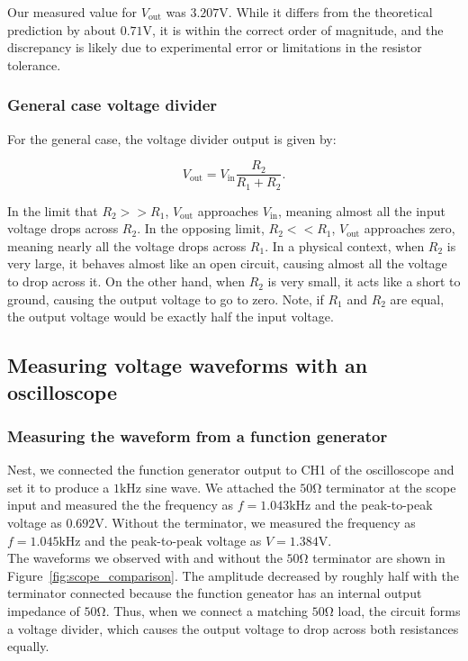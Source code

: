 \documentclass{article}
\begin{document}
\noindent Our measured value for $V_\text{out}$ was $3.207\si{\volt}$. While it differs
from the theoretical prediction by about $0.71\si{\volt}$, it is within the correct
order of magnitude, and the discrepancy is likely due to experimental error or limitations
in the resistor tolerance.

\subsubsection{General case voltage divider}

For the general case, the voltage divider output is given by:

\begin{equation}
    V_\text{out}=V_\text{in}\frac{R_2}{R_1+R_2}.
\end{equation}

\noindent In the limit that $R_2 >> R_1$, $V_\text{out}$ approaches 
$V_\text{in}$, meaning almost all the input voltage drops across $R_2$.
In the opposing limit, $R_2 << R_1$, $V_\text{out}$ approaches zero, meaning
nearly all the voltage drops across $R_1$. In a physical context, when $R_2$ is
very large, it behaves almost like an open circuit, causing almost all the voltage
to drop across it. On the other hand, when $R_2$ is very small, it acts like a 
short to ground, causing the output voltage to go to zero. Note, if $R_1$ and $R_2$ 
are equal, the output voltage would be exactly half the input voltage.


\subsection{Measuring voltage waveforms with an oscilloscope}

\subsubsection{Measuring the waveform from a function generator}

Nest, we connected the function generator output to CH1 of the oscilloscope and
set it to produce a $1\si{\kilo\hertz}$ sine wave. We attached the $50\si{\ohm}$
terminator at the scope input and measured the the frequency as $f=1.043\si{\kilo\hertz}$
and the peak-to-peak voltage as $0.692\si{\volt}$. Without the terminator,
we measured the frequency as $f=1.045\si{\kilo\hertz}$ and the peak-to-peak
voltage as $V=1.384\si{\volt}$.\\

\noindent The waveforms we observed with and without the $50\si{\ohm}$ 
terminator are shown in Figure~\ref{fig:scope_comparison}. The amplitude
decreased by roughly half with the terminator connected because the function
geneator has an internal output impedance of $50\si{\ohm}$. Thus, when we
connect a matching $50\si{\ohm}$ load, the circuit forms a voltage divider, 
which causes the output voltage to drop across both resistances equally.
\end{document}
